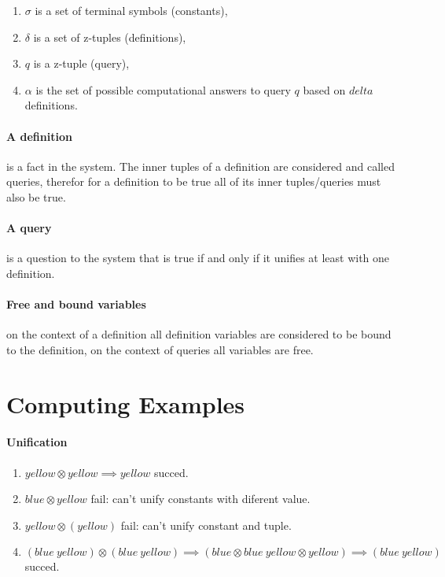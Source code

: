 \documentclass[11pt,a4paper]{report}
\newcommand{\unify}{\otimes}
\begin{document}
\begin{enumerate}
\item $\sigma$ is a set of terminal symbols (constants),
\item $\delta$ is a set of z-tuples (definitions),
\item $q$ is a z-tuple (query),
\item $\alpha$ is the set of possible computational answers to query $q$ based on $delta$ definitions.
\end{enumerate}


\paragraph{A definition} is a fact in the system. The inner tuples of a definition are considered and called queries, therefor 
for a definition to be true all of its inner tuples/queries must also be true.

\paragraph{A query} is a question to the system that is true if and only if it unifies at least with 
one definition.

\paragraph{Free and bound variables} on the context of a definition all definition variables are considered 
to be bound to the definition, on the context of queries all variables are free.


\section{Computing Examples}

\paragraph{Unification}
\begin{enumerate}
\item $yellow \unify yellow \implies yellow$
    \subitem succed.
\item $blue \unify yellow$
    \subitem fail: can't unify constants with diferent value.
\item $yellow \unify (yellow)$
    \subitem fail: can't unify constant and tuple.
\item $(blue\ yellow) \unify (blue\ yellow) \implies (blue \unify blue\ yellow \unify yellow) \implies (blue\ yellow)$
    \subitem succed.
\end{enumerate}
\end{document}
